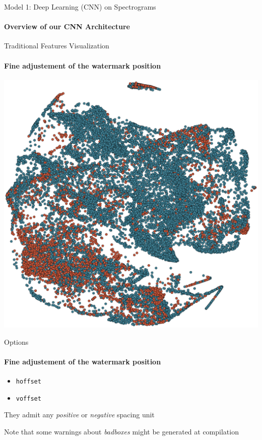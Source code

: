 \documentclass{beamer}
\begin{document}
\begin{frame}{Model 1: Deep Learning (CNN) on Spectrograms}
  \framesubtitle{Overview of our CNN Architecture}
  
\end{frame}


\begin{frame}{Traditional Features Visualization}
  \framesubtitle{Fine adjustement of the watermark position}

  \begin{center}
    \vspace*{-0.15cm}
  \includegraphics[scale=0.35]{img/trad_feat_viz.eps}
  \end{center}

\end{frame}


\begin{frame}{Options}
  \framesubtitle{Fine adjustement of the watermark position}

  
  \begin{itemize}
    \item \texttt{hoffset}
    \item \texttt{voffset}
  \end{itemize}
  
  They admit any \emph{positive} or \emph{negative} spacing \alert{unit}
  
  Note that some \alert{warnings} about \emph{badboxes} might be generated at compilation

\end{frame}
\end{document}
